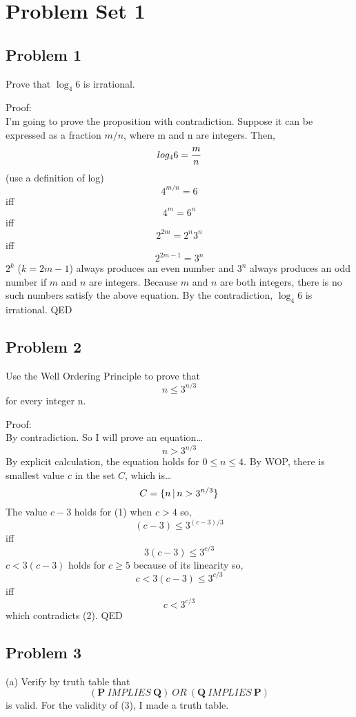 \documentclass{article}
\begin{document}
\section*{Problem Set 1}

\subsection*{Problem 1}
Prove that $\log_4{6}$ is irrational.

\noindent
Proof: \\
I'm going to prove the proposition with contradiction. Suppose it can be expressed as a fraction $m/n$, where m and n are integers. Then,
\[ log_4{6} = {m \over n} \]
(use a definition of log)
\[ 4^{m / n} = 6 \]
iff
\[ 4^m = 6^n \]
iff
\[ 2^{2m} = 2^n3^n \]
iff
\[ 2^{2m-1} = 3^n \]
$2^k$ ($k=2m-1$) always produces an even number and $3^n$ always produces an odd number if $m$ and $n$ are integers. Because $m$ and $n$ are both integers, there is no such numbers satisfy the above equation.
By the contradiction, $\log_4{6}$ is irrational. QED

\subsection*{Problem 2}
Use the Well Ordering Principle to prove that
\begin{equation}
n \le 3^{n/3}
\end{equation}
for every integer n.

\noindent
Proof: \\
By contradiction. So I will prove an equation\dots
\begin{equation}
    n > 3^{n/3}
\end{equation}
By explicit calculation, the equation holds for $0 \le n \le 4$. By WOP, there is smallest value $c$ in the set $C$, which is\dots
\[ C = \{ n \thinspace | \thinspace n > 3^{n/3} \} \]
The value $c-3$ holds for (1) when $c>4$ so,
\[ (c-3) \le 3^{(c-3)/3} \]
iff
\[ 3(c-3) \le 3^{c/3} \]
$c < 3(c-3)$ holds for $c \ge 5$ because of its linearity so,
\[ c < 3(c-3) \le 3^{c/3}\]
iff
\[ c < 3^{c/3} \]
which contradicts (2). QED

\subsection*{Problem 3}
(a) Verify by truth table that 
\begin{equation}
    (\mathbf{P} \ IMPLIES\ \mathbf{Q} )\ OR\ (\mathbf{Q} \ IMPLIES\ \mathbf{P})
\end{equation}
is valid.
For the validity of (3), I made a truth table.
\end{document}
